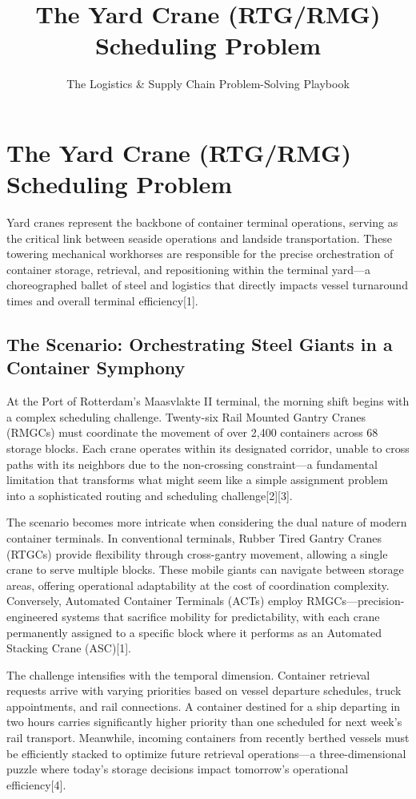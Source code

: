 \documentclass{article}
\title{The Yard Crane (RTG/RMG) Scheduling Problem}
\author{The Logistics \& Supply Chain Problem-Solving Playbook}
\date{}
\begin{document}
\maketitle

\section{The Yard Crane (RTG/RMG) Scheduling Problem}

Yard cranes represent the backbone of container terminal operations, serving as the critical link between seaside operations and landside transportation. These towering mechanical workhorses are responsible for the precise orchestration of container storage, retrieval, and repositioning within the terminal yard---a choreographed ballet of steel and logistics that directly impacts vessel turnaround times and overall terminal efficiency[1].

\subsection{The Scenario: Orchestrating Steel Giants in a Container Symphony}

At the Port of Rotterdam's Maasvlakte II terminal, the morning shift begins with a complex scheduling challenge. Twenty-six Rail Mounted Gantry Cranes (RMGCs) must coordinate the movement of over 2,400 containers across 68 storage blocks. Each crane operates within its designated corridor, unable to cross paths with its neighbors due to the non-crossing constraint---a fundamental limitation that transforms what might seem like a simple assignment problem into a sophisticated routing and scheduling challenge[2][3].

The scenario becomes more intricate when considering the dual nature of modern container terminals. In conventional terminals, Rubber Tired Gantry Cranes (RTGCs) provide flexibility through cross-gantry movement, allowing a single crane to serve multiple blocks. These mobile giants can navigate between storage areas, offering operational adaptability at the cost of coordination complexity. Conversely, Automated Container Terminals (ACTs) employ RMGCs---precision-engineered systems that sacrifice mobility for predictability, with each crane permanently assigned to a specific block where it performs as an Automated Stacking Crane (ASC)[1].

The challenge intensifies with the temporal dimension. Container retrieval requests arrive with varying priorities based on vessel departure schedules, truck appointments, and rail connections. A container destined for a ship departing in two hours carries significantly higher priority than one scheduled for next week's rail transport. Meanwhile, incoming containers from recently berthed vessels must be efficiently stacked to optimize future retrieval operations---a three-dimensional puzzle where today's storage decisions impact tomorrow's operational efficiency[4].
\end{document}
